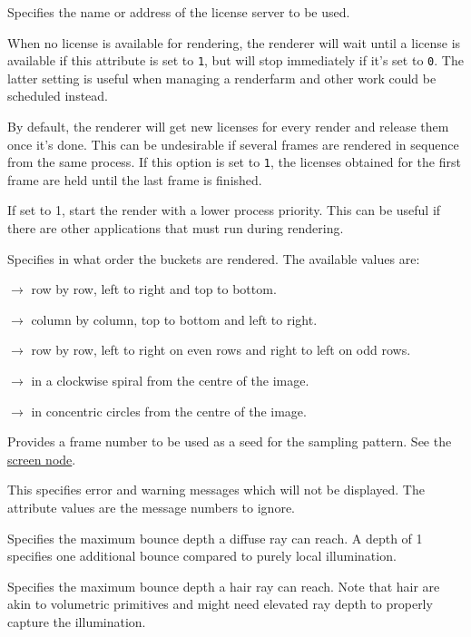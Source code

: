 \documentclass[oneside,ebook]{memoir}
\newcommand{\paramlistitemTN}[2]{\item[#2\textcolor{lightgray}{\dotfill}#1]}
\newcommand{\paramlistitemTND}[3]{\paramlistitemTN{#1 {\rmfamily({\ttfamily#3})}}{#2}}
\newcommand{\paramvalueitem}[1]{\item[#1]$\rightarrow$}
\begin{document}
\begin{paramlist}
\paramlistitemTN{string}{license.server}
Specifies the name or address of the license server to be used.
\paramlistitemTND{int}{license.wait}{1}
When no license is available for rendering, the renderer will wait until a license is available if this attribute is set to \lstinline|1|, but will stop immediately if it's set to \lstinline|0|. The latter setting is useful when managing a renderfarm and other work could be scheduled instead.
\paramlistitemTND{int}{license.hold}{0}
By default, the renderer will get new licenses for every render and release them once it's done. This can be undesirable if several frames are rendered in sequence from the same process. If this option is set to \lstinline|1|, the licenses obtained for the first frame are held until the last frame is finished.
\paramlistitemTND{int}{renderatlowpriority}{0}
If set to 1, start the render with a lower process priority.
This can be useful if there are other applications that must run during rendering.
\paramlistitemTND{string}{bucketorder}{horizontal}
Specifies in what order the buckets are rendered. The available values are:
\begin{paramvaluelist}
\paramvalueitem{horizontal}
row by row, left to right and top to bottom.
\paramvalueitem{vertical}
column by column, top to bottom and left to right.
\paramvalueitem{zigzag}
row by row, left to right on even rows and right to left on odd rows.
\paramvalueitem{spiral}
in a clockwise spiral from the centre of the image.
\paramvalueitem{circle}
in concentric circles from the centre of the image.
\end{paramvaluelist}
\paramlistitemTND{double}{frame}{0}
Provides a frame number to be used as a seed for the sampling pattern. See the \hyperref[section:screennode]{screen node}.
\paramlistitemTN{int}{hidemessages}
This specifies error and warning messages which will not be displayed.
The attribute values are the message numbers to ignore.
\paramlistitemTND{int}{maximumraydepth.diffuse}{1}
Specifies the maximum bounce depth a diffuse ray can reach. A depth of 1 specifies one additional bounce compared to purely local illumination.
\paramlistitemTND{int}{maximumraydepth.hair}{4}
Specifies the maximum bounce depth a hair ray can reach. Note that hair are akin to volumetric primitives and might need elevated ray depth to properly capture the illumination.

\end{paramlist}
\end{document}
